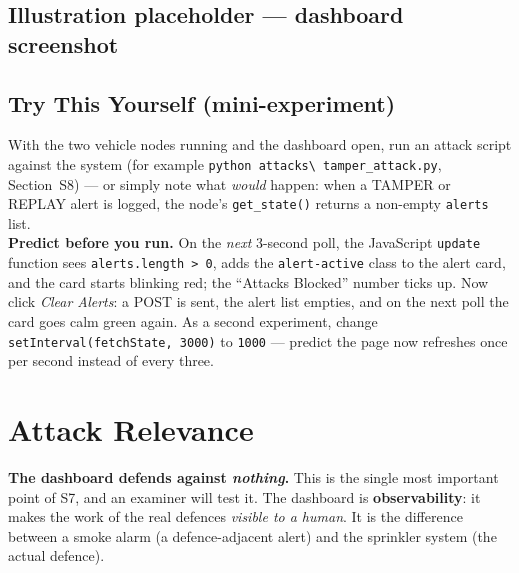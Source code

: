 \documentclass[11pt,a4paper]{article}
\begin{document}
\subsection{Illustration placeholder --- dashboard screenshot}
\begin{center}
\end{center}

\subsection{Try This Yourself (mini-experiment)}
With the two vehicle nodes running and the dashboard open, run an attack script
against the system (for example \texttt{python attacks\textbackslash
tamper\_attack.py}, Section~S8) --- or simply note what \emph{would} happen:
when a TAMPER or REPLAY alert is logged, the node's \texttt{get\_state()} returns
a non-empty \texttt{alerts} list.\\
\textbf{Predict before you run.} On the \emph{next} 3-second poll, the JavaScript
\texttt{update} function sees \texttt{alerts.length > 0}, adds the
\texttt{alert-active} class to the alert card, and the card starts blinking red;
the ``Attacks Blocked'' number ticks up. Now click \emph{Clear Alerts}: a POST is
sent, the alert list empties, and on the next poll the card goes calm green
again. As a second experiment, change \texttt{setInterval(fetchState, 3000)} to
\texttt{1000} --- predict the page now refreshes once per second instead of every
three.

\section{Attack Relevance}

\textbf{The dashboard defends against \emph{nothing}.} This is the single most
important point of S7, and an examiner will test it. The dashboard is
\textbf{observability}: it makes the work of the real defences \emph{visible to a
human}. It is the difference between a smoke alarm (a defence-adjacent alert) and
the sprinkler system (the actual defence).
\end{document}
